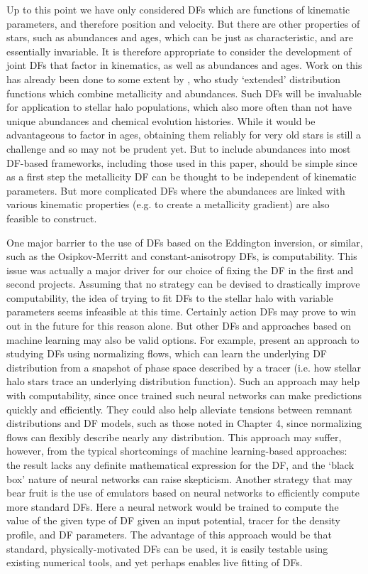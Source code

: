 Up to this point we have only considered DFs which are functions of kinematic parameters, and therefore position and velocity. But there are other properties of stars, such as abundances and ages, which can be just as characteristic, and are essentially invariable. It is therefore appropriate to consider the development of joint DFs that factor in kinematics, as well as abundances and ages. Work on this has already been done to some extent by \textcite{sanders15b}, who study `extended' distribution functions which combine metallicity and abundances. Such DFs will be invaluable for application to stellar halo populations, which also more often than not have unique abundances and chemical evolution histories. While it would be advantageous to factor in ages, obtaining them reliably for very old stars is still a challenge and so may not be prudent yet. But to include abundances into most DF-based frameworks, including those used in this paper, should be simple since as a first step the metallicity DF can be thought to be independent of kinematic parameters. But more complicated DFs where the abundances are linked with various kinematic properties (e.g. to create a metallicity gradient) are also feasible to construct.

One major barrier to the use of DFs based on the Eddington inversion, or similar, such as the Osipkov-Merritt and constant-anisotropy DFs, is computability. This issue was actually a major driver for our choice of fixing the DF in the first and second projects. Assuming that no strategy can be devised to drastically improve computability, the idea of trying to fit DFs to the stellar halo with variable parameters seems infeasible at this time. Certainly action DFs may prove to win out in the future for this reason alone. But other DFs and approaches based on machine learning may also be valid options. For example, \textcite{green23} present an approach to studying DFs using normalizing flows, which can learn the underlying DF distribution from a snapshot of phase space described by a tracer (i.e. how stellar halo stars trace an underlying distribution function). Such an approach may help with computability, since once trained such neural networks can make predictions quickly and efficiently. They could also help alleviate tensions between remnant distributions and DF models, such as those noted in Chapter 4, since normalizing flows can flexibly describe nearly any distribution. This approach may suffer, however, from the typical shortcomings of machine learning-based approaches: the result lacks any definite mathematical expression for the DF, and the `black box' nature of neural networks can raise skepticism. Another strategy that may bear fruit is the use of emulators based on neural networks to efficiently compute more standard DFs. Here a neural network would be trained to compute the value of the given type of DF given an input potential, tracer for the density profile, and DF parameters. The advantage of this approach would be that standard, physically-motivated DFs can be used, it is easily testable using existing numerical tools, and yet perhaps enables live fitting of DFs.

